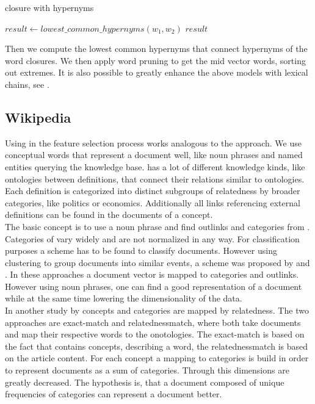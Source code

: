     \begin{algorithm}[H]
    \begin{algorithmic}[1]
      \caption{\wordnet{} closure with hypernyms}\label{wordnet}
          \State $result \gets lowest\_common\_hypernyms(w_1, w_2)$
        \EndFor
      \EndFor
      \State \Return $result$
    \end{algorithmic}
    \end{algorithm}

  Then we compute the lowest common hypernyms that connect hypernyms of the word closures. We then apply word pruning to get the mid vector words, sorting out extremes. It is also possible to greatly enhance the above models with lexical chains, see \cite{SemanticClusteringWithWordnet}.

  \subsection{Wikipedia}
  \label{sec:wikpedia}

  Using \wiki{} in the feature selection process works analogous to the \wordnet{} approach. We use conceptual words that represent a document well, like noun phrases and named entities querying the \wiki{} knowledge base. \wiki{} has a lot of different knowledge kinds, like ontologies between definitions, that connect their relations similar to \wordnet{} ontologies. Each definition is categorized into distinct subgroups of relatedness by broader categories, like politics or economics. Additionally all links referencing external definitions can be found in the documents of a \wiki{} concept.\\

  The basic concept is to use a noun phrase and find outlinks and categories from \wiki{}. Categories of \wiki{} vary widely and are not normalized in any way. For classification purposes a scheme has to be found to classify documents. However using clustering to group documents into similar events, a scheme was proposed by \cite{WikipediaClustering2010} and \cite{WikipediaClusteringSim2009}. In these approaches a document vector is mapped to categories and outlinks. However using noun phrases, one can find a good representation of a document while at the same time lowering the dimensionality of the  data.\\

  In another study by \cite{WikipediaClusteringSim2009} concepts and categories are mapped by relatedness. The two approaches are exact-match and relatednessmatch, where both take documents and map their respective words to the \wiki{} onotologies. The exact-match is based on the fact that \wiki{} contains concepts, describing a word, the relatednessmatch is based on the article content. For each concept a mapping to categories is build in order to represent documents as a sum of \wiki{} categories. Through this dimensions are greatly decreased. The hypothesis is, that a document composed of unique frequencies of categories can represent a document better.\\

